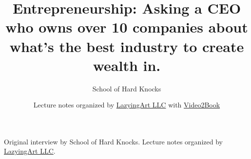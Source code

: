 \documentclass[11pt,oneside]{book}
\begin{document}
\frontmatter
\title{Entrepreneurship: Asking a CEO who owns over 10 companies about what's the best industry to create wealth in.}
\author{School of Hard Knocks}
\date{Lecture notes organized by \href{https://lazying.art}{LazyingArt LLC} with \href{https://github.com/lachlanchen/Video2Book}{Video2Book}}
\maketitle
\begin{center}
\small Original interview by School of Hard Knocks. Lecture notes organized by \href{https://lazying.art}{LazyingArt LLC}.
\end{center}
\clearpage
\mainmatter

\end{document}
